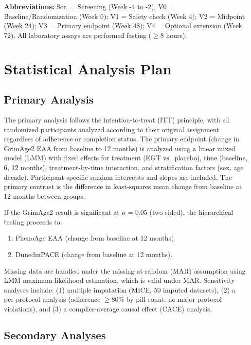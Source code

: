 \documentclass[11pt,a4paper]{article}
\begin{document}
\textbf{Abbreviations:} Scr. = Screening (Week -4 to -2); V0 = Baseline/Randomization (Week 0); V1 = Safety check (Week 4); V2 = Midpoint (Week 24); V3 = Primary endpoint (Week 48); V4 = Optional extension (Week 72). All laboratory assays are performed fasting ($\geq$8 hours).

\section{Statistical Analysis Plan}

\subsection{Primary Analysis}

The primary analysis follows the intention-to-treat (ITT) principle, with all randomized participants analyzed according to their original assignment regardless of adherence or completion status. The primary endpoint (change in GrimAge2 EAA from baseline to 12 months) is analyzed using a linear mixed model (LMM) with fixed effects for treatment (EGT vs.~placebo), time (baseline, 6, 12 months), treatment-by-time interaction, and stratification factors (sex, age decade). Participant-specific random intercepts and slopes are included. The primary contrast is the difference in least-squares mean change from baseline at 12 months between groups.

If the GrimAge2 result is significant at $\alpha = 0.05$ (two-sided), the hierarchical testing proceeds to:
\begin{enumerate}[nosep]
  \item PhenoAge EAA (change from baseline at 12 months).
  \item DunedinPACE (change from baseline at 12 months).
\end{enumerate}

Missing data are handled under the missing-at-random (MAR) assumption using LMM maximum likelihood estimation, which is valid under MAR. Sensitivity analyses include: (1) multiple imputation (MICE, 50 imputed datasets), (2) a per-protocol analysis (adherence $\geq$80\% by pill count, no major protocol violations), and (3) a complier-average causal effect (CACE) analysis.

\subsection{Secondary Analyses}
\end{document}
